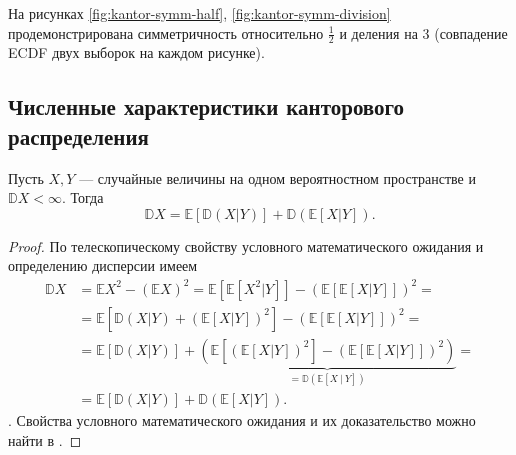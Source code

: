 \documentclass[11pt]{report}
\begin{document}
На рисунках \ref{fig:kantor-symm-half}, \ref{fig:kantor-symm-division} продемонстрирована симметричность относительно $\frac{1}{2}$ и деления на 3 (совпадение ECDF двух выборок на каждом рисунке).

\subsection{Численные характеристики канторового распределения}

\begin{statement}
Пусть $X,Y$ --- случайные величины на одном вероятностном пространстве и $\mathbb{D}X<\infty$. Тогда
$$
\mathbb{D}X = \mathbb{E}[\mathbb{D}(X|Y)] + \mathbb{D}(\mathbb{E}[X|Y]).
$$
\end{statement}
\begin{proof}
По телескопическому свойству условного математического ожидания и определению дисперсии имеем
$$
\begin{aligned}
\mathbb{D}X &= \mathbb{E}X^2 - (\mathbb{E}X)^2 = \mathbb{E}[\mathbb{E}[X^2|Y]] - (\mathbb{E}[\mathbb{E}[X|Y]])^2 = \\
&= \mathbb{E}[\mathbb{D}(X|Y) + (\mathbb{E}[X|Y])^2] - (\mathbb{E}[\mathbb{E}[X|Y]])^2 = \\
&= \mathbb{E}[\mathbb{D}(X|Y)] + \underbrace{(\mathbb{E}[(\mathbb{E}[X|Y])^2] - (\mathbb{E}[\mathbb{E}[X|Y]])^2)}_{=\mathbb{D}(\mathbb{E}[X~|~Y])}=\\
&= \mathbb{E}[\mathbb{D}(X|Y)] + \mathbb{D}(\mathbb{E}[X|Y]).
\end{aligned}
$$.
Свойства условного математического ожидания и их доказательство можно найти в \cite{shiryaev-1}.
\end{proof}
\end{document}
